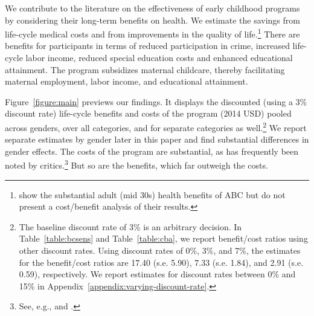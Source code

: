 We contribute to the literature on the effectiveness of early childhood programs by considering their long-term benefits on health. We estimate the savings from life-cycle medical costs and from improvements in the quality of life.\footnote{\cite{Campbell_Conti_etal_2014_EarlyChildhoodInvestments} show the substantial adult (mid 30s) health benefits of ABC but do not present a cost/benefit analysis of their results.} There are benefits for participants in terms of reduced participation in crime, increased life-cycle labor income, reduced special education costs and enhanced educational attainment. The program subsidizes maternal childcare, thereby facilitating maternal employment, labor income, and educational attainment.

Figure~\ref{figure:main} previews our findings. It displays the discounted (using a 3\% discount rate) life-cycle benefits and costs of the program (2014 USD) pooled across genders, over all categories, and for separate categories as well.\footnote{The baseline discount rate of 3\% is an arbitrary decision. In Table~\ref{table:bcsens} and Table~\ref{table:cba}, we report benefit/cost ratios using other discount rates. Using discount rates of 0\%, 3\%, and 7\%, the estimates for the benefit/cost ratios are 17.40 (s.e. 5.90), 7.33 (s.e. 1.84), and 2.91 (s.e. 0.59), respectively. We report estimates for discount rates between 0\% and 15\% in  Appendix~\ref{appendix:varying-discount-rate}.} We report separate estimates by gender later in this paper and find substantial differences in gender effects. The costs of the program are substantial, as has frequently been noted by critics.\footnote{See, e.g., \citet{Fox_News_2014_Head_Start_Effects} and \citet{Whitehurst_2014_Senate_Testimony}.} But so are the benefits, which far outweigh the costs.

